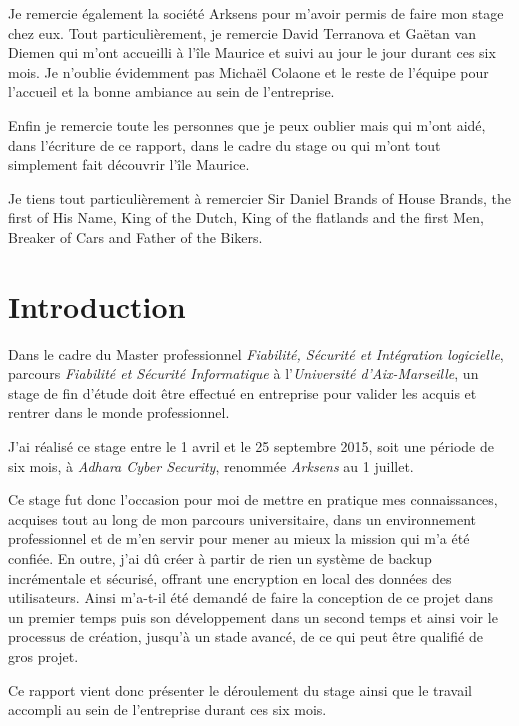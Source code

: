 \documentclass[a4paper,10pt, twoside]{report}
\begin{document}
\begin{spacing}{1.2}
Je remercie \'egalement la soci\'et\'e Arksens pour m'avoir permis de faire mon
stage chez eux. Tout particuli\`erement, je remercie David Terranova et Ga\"etan
van Diemen qui m'ont accueilli \`a l'\^ile Maurice et suivi au jour le jour
durant ces six mois. Je n'oublie \'evidemment pas Micha\"el Colaone et le reste
de l'\'equipe pour l'accueil et la bonne ambiance au sein de l'entreprise.

Enfin je remercie toute les personnes que je peux oublier mais qui m'ont aid\'e,
dans l'\'ecriture de ce rapport, dans le cadre du stage ou qui m'ont tout
simplement fait d\'ecouvrir l'\^ile Maurice.

Je tiens tout particuli\`erement \`a remercier Sir Daniel Brands of House Brands,
the first of His Name, King of the Dutch, King of the flatlands and the first
Men, Breaker of Cars and Father of the Bikers.

\hfill
\tableofcontents
\thispagestyle{fancy}

\chapter*{Introduction}
\thispagestyle{fancy}
Dans le cadre du Master professionnel \textit{Fiabilit\'e, S\'ecurit\'e et
Int\'egration logicielle}, parcours \textit{Fiabilit\'e et S\'ecurit\'e
Informatique} \`a l'\textit{Universit\'e d'Aix-Marseille}, un stage de fin
d'\'etude doit \^etre effectu\'e en entreprise pour valider les acquis et
rentrer dans le monde professionnel.

J'ai r\'ealis\'e ce stage entre le 1 avril et le 25 septembre 2015, soit
une p\'eriode de six mois, \`a \textit{Adhara Cyber Security}, renomm\'ee 
\textit{Arksens} au 1 juillet.

Ce stage fut donc l'occasion pour moi de mettre en pratique mes connaissances,
acquises tout au long de mon parcours universitaire, dans un environnement
professionnel et de m'en servir pour mener au mieux la mission qui m'a
\'et\'e confi\'ee. En outre, j'ai d\^u cr\'eer \`a partir de rien un syst\`eme
de backup incr\'ementale et s\'ecuris\'e, offrant une encryption en local des
donn\'ees des utilisateurs. Ainsi m'a-t-il \'et\'e demand\'e de faire la
conception de ce projet dans un premier temps puis son d\'eveloppement dans un
second temps et ainsi voir le processus de cr\'eation, jusqu'\`a un stade
avanc\'e, de ce qui peut \^etre qualifi\'e de gros projet.

Ce rapport vient donc pr\'esenter le d\'eroulement du stage ainsi que le
travail accompli au sein de l'entreprise durant ces six mois.



\end{spacing}
\end{document}
